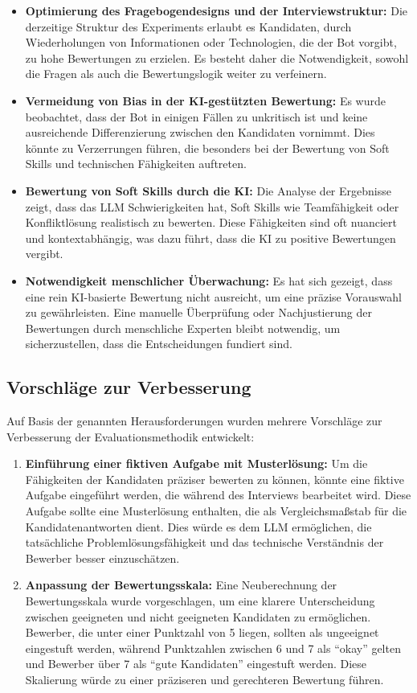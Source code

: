 \begin{itemize}
    \item \textbf{Optimierung des Fragebogendesigns und der Interviewstruktur:} Die derzeitige Struktur des Experiments erlaubt es Kandidaten, durch Wiederholungen von Informationen oder Technologien, die der Bot vorgibt, zu hohe Bewertungen zu erzielen. Es besteht daher die Notwendigkeit, sowohl die Fragen als auch die Bewertungslogik weiter zu verfeinern.
    \item \textbf{Vermeidung von Bias in der \acs{KI}-gestützten Bewertung:} Es wurde beobachtet, dass der Bot in einigen Fällen zu unkritisch ist und keine ausreichende Differenzierung zwischen den Kandidaten vornimmt. Dies könnte zu Verzerrungen führen, die besonders bei der Bewertung von Soft Skills und technischen Fähigkeiten auftreten.
    \item \textbf{Bewertung von Soft Skills durch die \acs{KI}:} Die Analyse der Ergebnisse zeigt, dass das \acs{LLM} Schwierigkeiten hat, Soft Skills wie Teamfähigkeit oder Konfliktlösung realistisch zu bewerten. Diese Fähigkeiten sind oft nuanciert und kontextabhängig, was dazu führt, dass die \acs{KI} zu positive Bewertungen vergibt.
    \item \textbf{Notwendigkeit menschlicher Überwachung:} Es hat sich gezeigt, dass eine rein \acs{KI}-basierte Bewertung nicht ausreicht, um eine präzise Vorauswahl zu gewährleisten. Eine manuelle Überprüfung oder Nachjustierung der Bewertungen durch menschliche Experten bleibt notwendig, um sicherzustellen, dass die Entscheidungen fundiert sind.
\end{itemize}

\subsection{Vorschläge zur Verbesserung}

Auf Basis der genannten Herausforderungen wurden mehrere Vorschläge zur Verbesserung der Evaluationsmethodik entwickelt:

\begin{enumerate}
    \item \textbf{Einführung einer fiktiven Aufgabe mit Musterlösung:} Um die Fähigkeiten der Kandidaten präziser bewerten zu können, könnte eine fiktive Aufgabe eingeführt werden, die während des Interviews bearbeitet wird. Diese Aufgabe sollte eine Musterlösung enthalten, die als Vergleichsmaßstab für die Kandidatenantworten dient. Dies würde es dem \acs{LLM} ermöglichen, die tatsächliche Problemlösungsfähigkeit und das technische Verständnis der Bewerber besser einzuschätzen.
    \item \textbf{Anpassung der Bewertungsskala:} Eine Neuberechnung der Bewertungsskala wurde vorgeschlagen, um eine klarere Unterscheidung zwischen geeigneten und nicht geeigneten Kandidaten zu ermöglichen. Bewerber, die unter einer Punktzahl von 5 liegen, sollten als ungeeignet eingestuft werden, während Punktzahlen zwischen 6 und 7 als \enquote{okay} gelten und Bewerber über 7 als \enquote{gute Kandidaten} eingestuft werden. Diese Skalierung würde zu einer präziseren und gerechteren Bewertung führen.
\end{enumerate}

